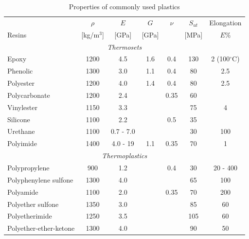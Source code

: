 \documentclass[
10pt,
a4paper,
openany,
svgnames,
]{book}
\begin{document}
\begin{table}[H]
  \centering
  \caption{Properties of commonly used plastics \cite{gay2014composite}}
  \begin{tabular}{lcccccc}
    \toprule
    & $\rho$         & $E$ & $G$ & $\nu$ & $S_{ut}$ & Elongation \\
    Resins & [kg/m$^3$] & [GPa] & [GPa] &       & [MPa]      & $E\%$ \\
    \midrule
    \multicolumn{7}{c}{\emph{Thermosets}} \\
    Epoxy         & 1200 & 4.5          & 1.6 & 0.4  & 130 & 2 (100$^{\circ}$C) \\
    Phenolic      & 1300 & 3.0          & 1.1 & 0.4  & 80  & 2.5 \\
    Polyester     & 1200 & 4.0          & 1.4 & 0.4  & 80  & 2.5 \\
    Polycarbonate & 1200 & 2.4          &     & 0.35 & 60  & \\
    Vinylester    & 1150 & 3.3          &     &      & 75  & 4 \\
    Silicone      & 1100 & 2.2          &     & 0.5  & 35  & \\
    Urethane      & 1100 & 0.7 - 7.0    &     &      & 30  & 100 \\
    Polyimide     & 1400 & 4.0 - 19     & 1.1 & 0.35 & 70  & 1 \\
    \multicolumn{7}{c}{\emph{Thermoplastics}} \\
    Polypropylene          & 900  & 1.2 & & 0.4  & 30  & 20 - 400 \\
    Polyphenylene sulfone  & 1300 & 4.0 & &      & 65  & 100 \\
    Polyamide              & 1100 & 2.0 & & 0.35 & 70  & 200 \\
    Polyether sulfone      & 1350 & 3.0 & &      & 85  & 60 \\
    Polyetherimide         & 1250 & 3.5 & &      & 105 & 60 \\
    Polyether-ether-ketone & 1300 & 4.0 & &      & 90  & 50 \\
    \bottomrule
  \end{tabular}
  \label{tab: resin props}
\end{table}
\end{document}

